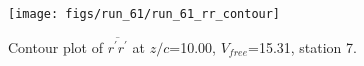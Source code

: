 \begin{figure}[H]
\centering
\texttt{[image: figs/run\_61/run\_61\_rr\_contour]}
\caption{Contour plot of $\overline{r^\prime r^\prime}$ at $z/c$=10.00, $V_{free}$=15.31, station 7.}
\end{figure}



